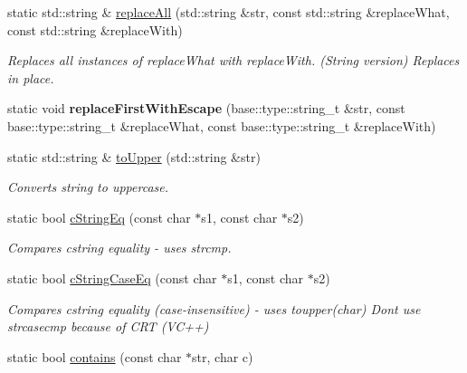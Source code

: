 \begin{DoxyCompactItemize}
static std\+::string \& \hyperlink{a00087_a8e823aa60b160451ca0b8732c3c75568}{replace\+All} (std\+::string \&str, const std\+::string \&replace\+What, const std\+::string \&replace\+With)
\begin{DoxyCompactList}\small\item\em Replaces all instances of \textquotesingle{}replace\+What\textquotesingle{} with \textquotesingle{}replace\+With\textquotesingle{}. (String version) Replaces in place. \end{DoxyCompactList}\item 
\hypertarget{a00087_a3725349f601d07316d1c2bc211daaaa1}{}static void {\bfseries replace\+First\+With\+Escape} (base\+::type\+::string\+\_\+t \&str, const base\+::type\+::string\+\_\+t \&replace\+What, const base\+::type\+::string\+\_\+t \&replace\+With)\label{a00087_a3725349f601d07316d1c2bc211daaaa1}

\item 
static std\+::string \& \hyperlink{a00087_a6a05315fb967508dc1faf0584421a95d}{to\+Upper} (std\+::string \&str)
\begin{DoxyCompactList}\small\item\em Converts string to uppercase. \end{DoxyCompactList}\item 
\hypertarget{a00087_a8081458c7848ff991d765c69f7858c44}{}static bool \hyperlink{a00087_a8081458c7848ff991d765c69f7858c44}{c\+String\+Eq} (const char $\ast$s1, const char $\ast$s2)\label{a00087_a8081458c7848ff991d765c69f7858c44}

\begin{DoxyCompactList}\small\item\em Compares cstring equality -\/ uses strcmp. \end{DoxyCompactList}\item 
\hypertarget{a00087_aaa37755d713b5e6475950134ce9ce0e8}{}static bool \hyperlink{a00087_aaa37755d713b5e6475950134ce9ce0e8}{c\+String\+Case\+Eq} (const char $\ast$s1, const char $\ast$s2)\label{a00087_aaa37755d713b5e6475950134ce9ce0e8}

\begin{DoxyCompactList}\small\item\em Compares cstring equality (case-\/insensitive) -\/ uses toupper(char) Dont use strcasecmp because of C\+R\+T (V\+C++) \end{DoxyCompactList}\item 
\hypertarget{a00087_a27cc1c1625b21597eb75df62b8fca0f8}{}static bool \hyperlink{a00087_a27cc1c1625b21597eb75df62b8fca0f8}{contains} (const char $\ast$str, char c)\label{a00087_a27cc1c1625b21597eb75df62b8fca0f8}


\end{DoxyCompactItemize}
